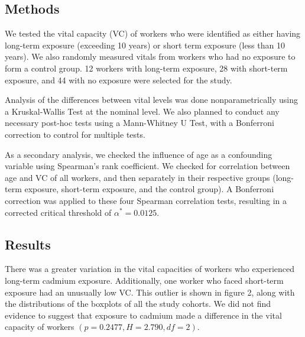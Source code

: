 \documentclass{article}
\begin{document}
	\subsection*{Methods}
		We tested the vital capacity (VC) of workers who were identified as either having long-term exposure (exceeding 10 years) or short term exposure (less than 10 years). We also randomly measured vitals from workers who had no exposure to form a control group. 12 workers with long-term exposure, 28 with short-term exposure, and 44 with no exposure were selected for the study.

		Analysis of the differences between vital levels was done nonparametrically using a Kruskal-Wallis Test at the nominal level. We also planned to conduct any necessary post-hoc tests using a Mann-Whitney U Test, with a Bonferroni correction to control for multiple tests.

		As a secondary analysis, we checked the influence of age as a confounding variable using Spearman’s rank coefficient. We checked for correlation between age and VC of all workers, and then separately in their respective groups (long-term exposure, short-term exposure, and the control group). A Bonferroni correction was applied to these four Spearman correlation tests, resulting in a corrected critical threshold of $\alpha^* = 0.0125$.
		
	\subsection*{Results}

		There was a greater variation in the vital capacities of workers who experienced long-term cadmium exposure. Additionally, one worker who faced short-term exposure had an unusually low VC. This outlier is shown in figure 2, along with the distributions of the boxplots of all the study cohorts. We did not find evidence to suggest that exposure to cadmium made a difference in the vital capacity of workers $(p = 0.2477, H = 2.790, df = 2)$.
\end{document}
